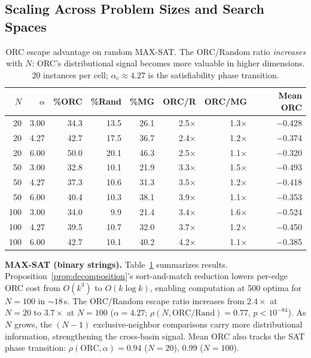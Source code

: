 \documentclass[runningheads]{llncs}
\begin{document}
\subsection{Scaling Across Problem Sizes and Search Spaces}
\label{sec:scaling}

\begin{table}[t]
\caption{ORC escape advantage on random MAX-SAT. The ORC/Random ratio \emph{increases} with $N$: ORC's distributional signal becomes more valuable in higher dimensions. 20 instances per cell; $\alpha_c \approx 4.27$ is the satisfiability phase transition.}
\label{tab:maxsat}
\centering
\small
\begin{tabular}{@{}rr|rrr|rr|r@{}}
\toprule
$N$ & $\alpha$ & \textbf{\%ORC} & \textbf{\%Rand} & \textbf{\%MG} & \textbf{ORC/R} & \textbf{ORC/MG} & \textbf{Mean ORC} \\
\midrule
 20 & 3.00 & 34.3 & 13.5 & 26.1 & 2.5$\times$ & 1.3$\times$ & $-$0.428 \\
 20 & 4.27 & 42.7 & 17.5 & 36.7 & 2.4$\times$ & 1.2$\times$ & $-$0.374 \\
 20 & 6.00 & 50.0 & 20.1 & 46.3 & 2.5$\times$ & 1.1$\times$ & $-$0.320 \\
\midrule
 50 & 3.00 & 32.8 & 10.1 & 21.9 & 3.3$\times$ & 1.5$\times$ & $-$0.493 \\
 50 & 4.27 & 37.3 & 10.6 & 31.3 & 3.5$\times$ & 1.2$\times$ & $-$0.418 \\
 50 & 6.00 & 40.4 & 10.3 & 38.1 & 3.9$\times$ & 1.1$\times$ & $-$0.353 \\
\midrule
100 & 3.00 & 34.0 &  9.9 & 21.4 & 3.4$\times$ & 1.6$\times$ & $-$0.524 \\
100 & 4.27 & 39.5 & 10.7 & 32.0 & 3.7$\times$ & 1.2$\times$ & $-$0.450 \\
100 & 6.00 & 42.7 & 10.1 & 40.2 & 4.2$\times$ & 1.1$\times$ & $-$0.385 \\
\bottomrule
\end{tabular}
\end{table}

\textbf{MAX-SAT (binary strings).}
Table~\ref{tab:maxsat} summarizes results.
Proposition~\ref{prop:decomposition}'s sort-and-match reduction lowers per-edge ORC cost from $O(k^3)$ to $O(k \log k)$, enabling computation at 500 optima for $N\!=\!100$ in ${\sim}18$\,s.
The ORC/Random escape ratio increases from $2.4\times$ at $N\!=\!20$ to $3.7\times$ at $N\!=\!100$ ($\alpha\!=\!4.27$; $\rho(N, \text{ORC/Rand}) = 0.77$, $p < 10^{-84}$).
As $N$ grows, the $(N\!-\!1)$ exclusive-neighbor comparisons carry more distributional information, strengthening the cross-basin signal.
Mean ORC also tracks the SAT phase transition: $\rho(\text{ORC}, \alpha) = 0.94$ ($N\!=\!20$), $0.99$ ($N\!=\!100$).
\end{document}
